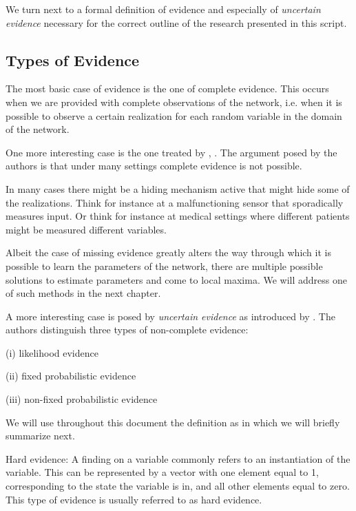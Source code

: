 \documentclass[11pt]{article}
\begin{document}
\begin{article}
We turn next to a formal definition of evidence and especially of
\emph{uncertain evidence} necessary for the correct outline of the
research presented in this script.

\subsection{Types of Evidence}
\label{sec:org87842fc}

The most basic case of evidence is the one of complete
evidence. This occurs when we are provided with complete
observations of the network, i.e.  when it is possible to observe a
certain realization for each random variable in the domain of the
network.

One more interesting case is the one treated by \cite{Mrad_2015},
\cite{Wasserkrug_all}. The argument posed by the authors is that under
many settings complete evidence is not possible.

In many cases there might be a hiding mechanism active that might
hide some of the realizations. Think for instance at a
malfunctioning sensor that sporadically measures input. Or think for
instance at medical settings where different patients might be
measured different variables.

Albeit the case of missing evidence greatly alters the way through
which it is possible to learn the parameters of the network, there
are multiple possible solutions to estimate parameters and come to
local maxima. We will address one of such methods in the next
chapter.

A more interesting case is posed by \emph{uncertain evidence} as
introduced by \cite{Mrad_2015}. The authors distinguish three types of
non-complete evidence:

(i) likelihood evidence

(ii) fixed probabilistic evidence

(iii) non-fixed probabilistic evidence

We will use throughout this document the definition as in
\cite{Mrad_2015} which we will briefly summarize next.

\begin{definition}
Hard evidence: A finding on a variable commonly refers to an
instantiation of the variable. This can be represented by a vector
with one element equal to 1, corresponding to the state the variable
is in, and all other elements equal to zero. This type of evidence
is usually referred to as hard evidence.
\end{definition}


\end{article}
\end{document}

